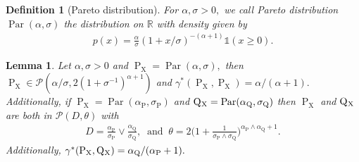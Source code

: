 \documentclass[10pt]{article}
\newcommand{\mP}{\mathcal{P}}
\newcommand{\RR}{\mathbb{R}}
\renewcommand{\P}{\operatorname{P}}
\newcommand{\Q}{\operatorname{Q}}
\newcommand{\Par}{\operatorname{Par}}
\newcommand{\sX}{\mathrm{X}}
\newtheorem{lemma}[theorem]{Lemma}
\newtheorem{definition}[theorem]{Definition}
\begin{document}
\begin{definition}[Pareto distribution]
    For $\alpha, \sigma > 0,$ we call Pareto distribution $\Par(\alpha, \sigma)$ the distribution on $\RR$ with density given by
    \begin{align*}
    p(x) = \frac{\alpha}{\sigma}(1 + x/\sigma)^{-(\alpha+1)}\mathds{1}(x\geq 0).
\end{align*}
\end{definition}


\begin{lemma}
    \label{lem.pareto}
    Let $\alpha, \sigma > 0$ and $\P_{\sX} = \Par(\alpha, \sigma),$ then $\P_{\sX} \in \mP(\alpha/\sigma, 2(1 + \sigma^{-1})^{\alpha +1})$ and $\gamma^*(\P_{\sX}, \P_{\sX}) = \alpha/(\alpha + 1).$ Additionally, if $\P_{\sX} = \Par(\alpha_{\P}, \sigma_{\P})$ and $\Q\mathstrut_{\!\sX} = \Par(\alpha_{\Q}, \sigma_{\Q})$ then $\P_{\sX}$ and $\Q\mathstrut_{\!\sX}$ are both in $\mP(D, \theta)$ with
    \begin{align*}
        D = \frac{\alpha_{\P}}{\sigma_{\P}}\vee\frac{\alpha_{\Q}}{\sigma_{\Q}}, \ \text{ and } \ \theta = 2\Big(1 + \frac{1}{\sigma_{\P}\wedge\sigma_{\Q}}\Big)^{\alpha_{\P}\wedge\alpha_{\Q} + 1}.
    \end{align*}
    Additionally, $\gamma^*(\P_{\sX}, \Q\mathstrut_{\!\sX}) = \alpha_{\Q}/(\alpha_{\P} + 1).$
\end{lemma}
\end{document}

